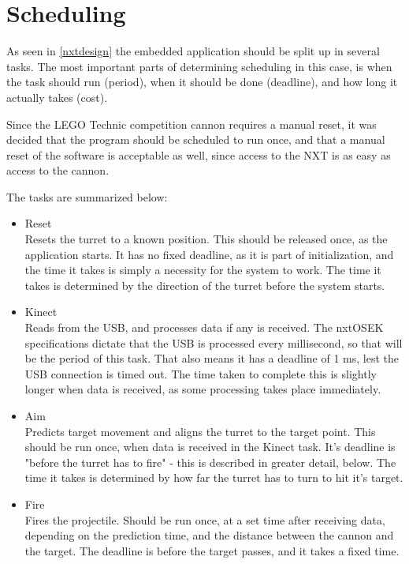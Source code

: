 \section{Scheduling}

As seen in \autoref{nxtdesign} the embedded application should be split up in several tasks.
The most important parts of determining scheduling in this case, is when the task should run
(period), when it should be done (deadline), and how long it actually takes (cost).

Since the LEGO Technic competition cannon requires a manual reset, it was decided that
the program should be scheduled to run once, and that a manual reset of the software is
acceptable as well, since access to the NXT is as easy as access to the cannon.

The tasks are summarized below:

\begin{itemize}
  \item{Reset}\\
  Resets the turret to a known position. This should be released once, as the application starts.
  It has no fixed deadline, as it is part of initialization, and the time it takes is
  simply a necessity for the system to work. The time it takes is determined by the direction
  of the turret before the system starts.
  \item{Kinect}\\
  Reads from the USB, and processes data if any is received. The nxtOSEK specifications dictate
  that the USB is processed every millisecond, so that will be the period of this task. That also
  means it has a deadline of 1 ms, lest the USB connection is timed out. The time taken to complete
  this is slightly longer when data is received, as some processing takes place immediately.
  \item{Aim}\\
  Predicts target movement and aligns the turret to the target point. This should be run once,
  when data is received in the Kinect task. It's deadline is "before the turret has to fire" - this
  is described in greater detail, below. The time it takes is determined by how far the turret has
  to turn to hit it's target.
  \item{Fire}\\
  Fires the projectile. Should be run once, at a set time after receiving data, depending on the
  prediction time, and the distance between the cannon and the target. The deadline is before 
  the target passes, and it takes a fixed time.
\end{itemize}

